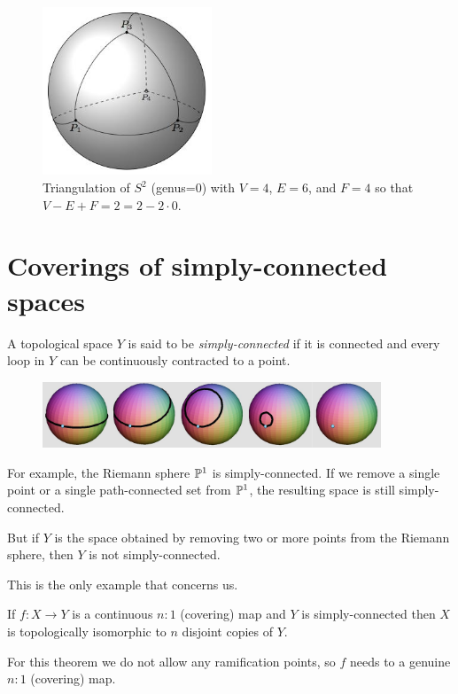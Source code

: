 \documentclass{amsart}
\begin{document}
  \begin{figure}[H]
  \centering
    \includegraphics[width=0.45\textwidth]{images/SphereTriangulation.jpg}
    \caption{Triangulation of $S^2$ (genus=0) with $V = 4$, $E=6$, and $F = 4$ so that $V - E + F = 2 = 2 - 2 \cdot 0$.}
  \end{figure}






  \section*{Coverings of simply-connected spaces}

  A topological space $Y$ is said to be \emph{simply-connected} if it is connected and every loop in $Y$ can be continuously contracted to a point.

  \begin{figure}[H]
  \centering
    \includegraphics[width=0.9\textwidth]{images/S2isSimplyConnected.jpg}
  \end{figure}


  For example, the Riemann sphere $\mathbb{P}^1$ is simply-connected. If we remove a single point or a single path-connected set from $\mathbb{P}^1$, the resulting space is still simply-connected.

  But if $Y$ is the space obtained by removing two or more points from the Riemann sphere, then $Y$ is not simply-connected.

  This is the only example that concerns us.

  \begin{theorem}
    If $f: X \rightarrow Y$ is a continuous $n:1$ (covering) map and $Y$ is simply-connected then $X$ is topologically isomorphic to $n$ disjoint copies of $Y$.
  \end{theorem}
  For this theorem we do not allow any ramification points, so $f$ needs to a genuine $n:1$ (covering) map.
\end{document}
